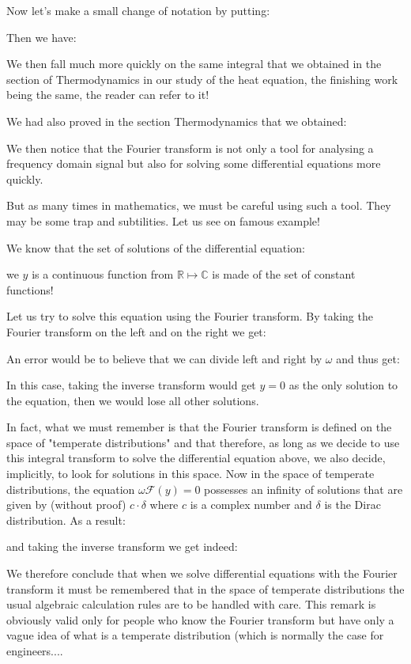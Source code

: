 	Now let's make a small change of notation by putting:
	
	Then we have:
	
	We then fall much more quickly on the same integral that we obtained in the section of Thermodynamics in our study of the heat equation, the finishing work being the same, the reader can refer to it!

	We had also proved in the section Thermodynamics that we obtained:
	
	We then notice that the Fourier transform is not only a tool for analysing a frequency domain signal but also for solving some differential equations more quickly.
	
	But as many times in mathematics, we must be careful using such a tool. They may be some trap and subtilities. Let us see on famous example!

	We know that the set of solutions of the differential equation:
	
	we $y$ is a continuous function from $\mathbb{R} \mapsto \mathbb{C}$ is made of the set of constant functions!
	
	Let us try to solve this equation using the Fourier transform. By taking the Fourier transform on the left and on the right we get:
	
	An error would be to believe that we can divide left and right by $\omega $ and thus get:
	
	In this case, taking the inverse transform would get $ y = 0 $ as the only solution to the equation, then we would lose all other solutions.
	
	In fact, what we must remember is that the Fourier transform is defined on the space of "temperate distributions" and that therefore, as long as we decide to use this integral transform to solve the differential equation  above, we also decide, implicitly, to look for solutions in this space. Now in the space of temperate distributions, the equation $\omega\mathcal{F}(y)=0$ possesses an infinity of solutions that are given by (without proof) $c\cdot \delta$ where $c$ is a complex number and $\delta$ is the Dirac distribution. As a result:
	
	and taking the inverse transform we get indeed:
	
	We therefore conclude that when we solve differential equations with the Fourier transform it must be remembered that in the space of temperate distributions the usual algebraic calculation rules are to be handled with care. This remark is obviously valid only for people who know the Fourier transform but have only a vague idea of what is a temperate distribution (which is normally the case for engineers....
			
